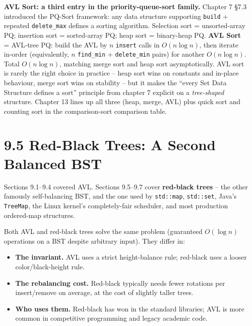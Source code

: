 \documentclass[11pt]{article}
\begin{document}
\begin{notebox}
\textbf{AVL Sort: a third entry in the priority-queue-sort family.}
Chapter 7 \S7.3 introduced the PQ-Sort framework: any data
structure supporting \texttt{build} + repeated \texttt{delete\_max}
defines a sorting algorithm. Selection sort = unsorted-array PQ;
insertion sort = sorted-array PQ; heap sort = binary-heap PQ.
\textbf{AVL Sort} = AVL-tree PQ: build the AVL by $n$
\texttt{insert} calls in $O(n \log n)$, then iterate in-order
(equivalently, $n$ \texttt{find\_min} + \texttt{delete\_min} pairs)
for another $O(n \log n)$. Total $O(n \log n)$, matching merge
sort and heap sort asymptotically. AVL sort is rarely the right
choice in practice -- heap sort wins on constants and in-place
behaviour, merge sort wins on stability -- but it makes the
``every Set Data Structure defines a sort'' principle from chapter
7 explicit on a \emph{tree-shaped} structure. Chapter 13 lines up
all three (heap, merge, AVL) plus quick sort and counting sort in
the comparison-sort comparison table.
\end{notebox}

\section{9.5 Red-Black Trees: A Second Balanced BST}

Sections 9.1--9.4 covered AVL. Sections 9.5--9.7 cover \textbf{red-black trees} -- the other famously self-balancing BST, and the one used by \texttt{std::map}, \texttt{std::set}, Java's \texttt{TreeMap}, the Linux kernel's completely-fair scheduler, and most production ordered-map structures.

Both AVL and red-black trees solve the same problem (guaranteed $O(\log n)$ operations on a BST despite arbitrary input). They differ in:
\begin{itemize}[leftmargin=*]
    \item \textbf{The invariant.} AVL uses a strict height-balance rule; red-black uses a looser color/black-height rule.
    \item \textbf{The rebalancing cost.} Red-black typically needs fewer rotations per insert/remove on average, at the cost of slightly taller trees.
    \item \textbf{Who uses them.} Red-black has won in the standard libraries; AVL is more common in competitive programming and legacy academic code.
\end{itemize}
\end{document}
